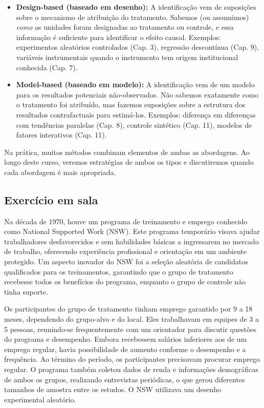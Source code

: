 \documentclass[
]{article}
\begin{document}
\begin{itemize}
\item
  \textbf{Design-based (baseado em desenho):} A identificação vem de suposições sobre o mecanismo de atribuição do tratamento. Sabemos (ou assumimos) \emph{como} as unidades foram designadas ao tratamento ou controle, e essa informação é suficiente para identificar o efeito causal. Exemplos: experimentos aleatórios controlados (Cap. 3), regressão descontínua (Cap. 9), variáveis instrumentais quando o instrumento tem origem institucional conhecida (Cap. 7).
\item
  \textbf{Model-based (baseado em modelo):} A identificação vem de um modelo para os resultados potenciais não-observados. Não sabemos exatamente como o tratamento foi atribuído, mas fazemos suposições sobre a estrutura dos resultados contrafactuais para estimá-los. Exemplos: diferença em diferenças com tendências paralelas (Cap. 8), controle sintético (Cap. 11), modelos de fatores interativos (Cap. 11).
\end{itemize}

Na prática, muitos métodos combinam elementos de ambas as abordagens. Ao longo deste curso, veremos estratégias de ambos os tipos e discutiremos quando cada abordagem é mais apropriada.

\subsection{Exercício em sala}\label{exercuxedcio-em-sala}

Na década de 1970, houve um programa de treinamento e emprego conhecido como National Supported Work (NSW). Este programa temporário visava ajudar trabalhadores desfavorecidos e sem habilidades básicas a ingressarem no mercado de trabalho, oferecendo experiência profissional e orientação em um ambiente protegido. Um aspecto inovador do NSW foi a seleção aleatória de candidatos qualificados para os treinamentos, garantindo que o grupo de tratamento recebesse todos os benefícios do programa, enquanto o grupo de controle não tinha suporte.

Os participantes do grupo de tratamento tinham emprego garantido por 9 a 18 meses, dependendo do grupo-alvo e do local. Eles trabalhavam em equipes de 3 a 5 pessoas, reunindo-se frequentemente com um orientador para discutir questões do programa e desempenho. Embora recebessem salários inferiores aos de um emprego regular, havia possibilidade de aumento conforme o desempenho e a frequência. Ao término do período, os participantes precisavam procurar emprego regular. O programa também coletou dados de renda e informações demográficas de ambos os grupos, realizando entrevistas periódicas, o que gerou diferentes tamanhos de amostra entre os estudos. O NSW utilizava um desenho experimental aleatório.
\end{document}
